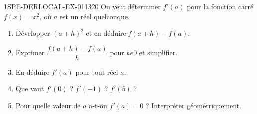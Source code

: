 \begin{exercice}{1SPE-DERLOCAL-EX-011}{3}{20}
On veut déterminer $f'(a)$ pour la fonction carré $f(x)=x^2$, où $a$ est un réel quelconque.
\begin{enumerate}
  \item Développer $(a+h)^2$ et en déduire $f(a+h)-f(a)$.
  \item Exprimer $\dfrac{f(a+h)-f(a)}{h}$ pour $h
e 0$ et simplifier.
  \item En déduire $f'(a)$ pour tout réel $a$.
  \item Que vaut $f'(0)$ ? $f'(-1)$ ? $f'(5)$ ?
  \item Pour quelle valeur de $a$ a-t-on $f'(a)=0$ ? Interpréter géométriquement.
\end{enumerate}
\end{exercice}
